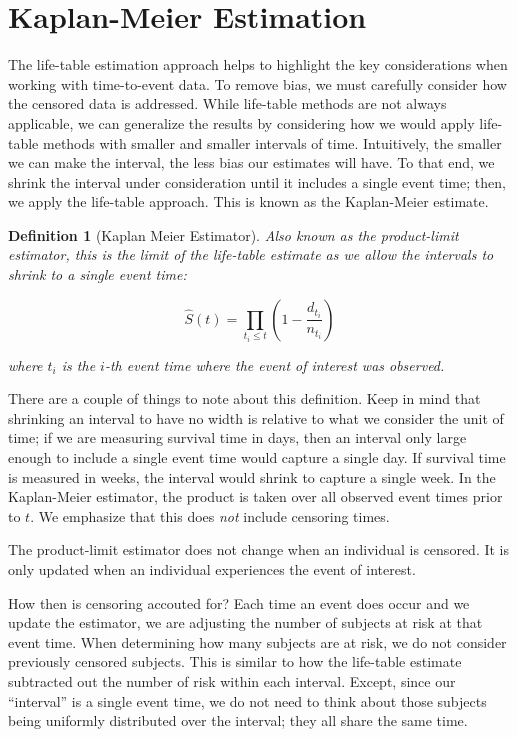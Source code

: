 \documentclass[
]{book}
\theoremstyle{plain}
\theoremstyle{mydefn}
\newtheorem{definition}{Definition}[chapter]
\theoremstyle{myexmpl}
\theoremstyle{remark}
\begin{document}
\hypertarget{kaplan-meier-estimation}{%
\section{Kaplan-Meier Estimation}\label{kaplan-meier-estimation}}

The life-table estimation approach helps to highlight the key considerations when working with time-to-event data. To remove bias, we must carefully consider how the censored data is addressed. While life-table methods are not always applicable, we can generalize the results by considering how we would apply life-table methods with smaller and smaller intervals of time. Intuitively, the smaller we can make the interval, the less bias our estimates will have. To that end, we shrink the interval under consideration until it includes a single event time; then, we apply the life-table approach. This is known as the Kaplan-Meier estimate.

\begin{definition}[Kaplan Meier Estimator]
Also known as the product-limit estimator, this is the limit of the life-table estimate as we allow the intervals to shrink to a single event time:

\[\widehat{S}(t) = \prod_{t_i \leq t} \left(1 - \frac{d_{t_i}}{n_{t_i}}\right)\]

where \(t_i\) is the \(i\)-th event time where the event of interest was observed.
\end{definition}

There are a couple of things to note about this definition. Keep in mind that shrinking an interval to have no width is relative to what we consider the unit of time; if we are measuring survival time in days, then an interval only large enough to include a single event time would capture a single day. If survival time is measured in weeks, the interval would shrink to capture a single week. In the Kaplan-Meier estimator, the product is taken over all observed event times prior to \(t\). We emphasize that this does \emph{not} include censoring times.

\begin{rmdwarning}
The product-limit estimator does not change when an individual is censored. It is only updated when an individual experiences the event of interest.
\end{rmdwarning}

How then is censoring accouted for? Each time an event does occur and we update the estimator, we are adjusting the number of subjects at risk at that event time. When determining how many subjects are at risk, we do not consider previously censored subjects. This is similar to how the life-table estimate subtracted out the number of risk within each interval. Except, since our ``interval'' is a single event time, we do not need to think about those subjects being uniformly distributed over the interval; they all share the same time.
\end{document}
